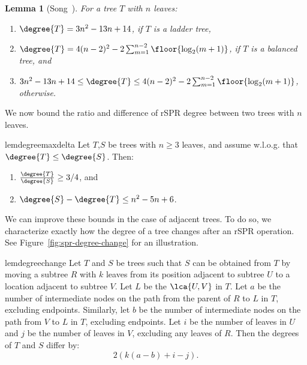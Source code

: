 \documentclass[10pt,twoside,leqno,twocolumn]{article}
\newtheorem{lem}[thm]{Lemma}
\newcommand{\cuttable}[2][]{%
    \ifthenelse{\equal{#1}{}}%
		{}%
		{#1}%
}
\begin{document}
\begin{lem}[{Song~\cite{Song2003-gf}}]
\cuttable{    \pushQED{\qed}}
	\label{lem:degree_extremes}
	For a tree $T$ with $n$ leaves:
	\begin{enumerate}
		\item $\degree{T} = 3n^2 - 13n + 14$, if $T$ is a ladder tree,
		\item $\degree{T} = 4(n-2)^2 - 2 \sum_{m=1}^{n-2} \floor{\log_2(m+1)}$, if $T$ is a balanced tree, and
		\item  $3n^2 - 13n + 14 \le \degree{T} \le 4(n-2)^2 - 2 \sum_{m=1}^{n-2} \floor{\log_2(m+1)}$, otherwise.
	\end{enumerate}
\cuttable{    \popQED}
\end{lem}

We now bound the ratio and difference of rSPR degree between two trees with $n$ leaves.
\begin{restatable}{lem}{degreemaxdelta}
	\label{lem:degree_max_delta}
	Let $T$,$S$ be trees with $n \ge 3$ leaves, and assume w.l.o.g. that $\degree{T} \le \degree{S}$.
	Then:
	\begin{enumerate}
		\item $\frac{\degree{T}}{\degree{S}} \ge 3/4$, and
		\item $\degree{S} - \degree{T} \le n^2 - 5n + 6$.
	\end{enumerate}
\end{restatable}

We can improve these bounds in the case of adjacent trees.
To do so, we \cuttable{require the following lemma that }characterize\cuttable{s} exactly how the degree of a tree changes after an rSPR operation.
See Figure~\ref{fig:spr-degree-change} for an illustration.

\begin{restatable}{lem}{degreechange}
\label{lem:degree_change}
Let $T$ and $S$ be trees such that $S$ can be obtained from $T$ by moving a subtree $R$ with $k$ leaves from its position adjacent to subtree $U$ to a location adjacent to subtree $V$.
Let $L$ be the $\lca{U,V}$ in $T$.
Let $a$ be the number of intermediate nodes on the path from the parent of $R$ to $L$ in $T$, excluding endpoints.
Similarly, let $b$ be the number of intermediate nodes on the path from $V$ to $L$ in $T$, excluding endpoints.
Let $i$ be the number of leaves in $U$ and $j$ be the number of leaves in $V$, excluding any leaves of $R$.
Then the degrees of $T$ and $S$ differ by:
$$2\left(k(a-b) + i - j\right).$$

\end{restatable}
\end{document}
